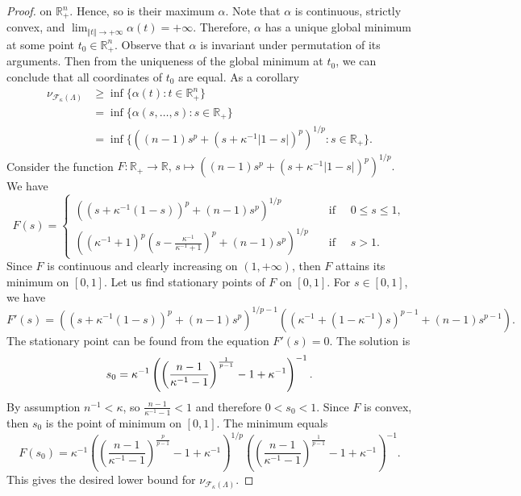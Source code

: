 \documentclass[12pt]{article}
\begin{document}
\begin{proof}
    on $\mathbb{R}_+^n$. Hence, so is their maximum $\alpha$. Note 
    that $\alpha$ is continuous, strictly convex, 
    and $\lim_{\Vert t\Vert\to+\infty}\alpha(t)=+\infty$. Therefore, $\alpha$ 
    has a unique global minimum at some point $t_0\in\mathbb{R}_+^n$. Observe 
    that $\alpha$ is invariant under permutation of its arguments. Then from 
    the uniqueness of the global minimum at $t_0$, we can conclude that all 
    coordinates of $t_0$ are equal. As a corollary
    \[
    \begin{aligned}
        \nu_{\mathcal{F}_{\kappa}(\Lambda)}
        &\geq\inf\{\alpha(t) : t\in\mathbb{R}_+^n\} \\
        &=\inf\{\alpha(s,\ldots,s) : s\in\mathbb{R}_+\} \\
        &=\inf\{((n-1)s^p+(s+\kappa^{-1}|1-s|)^p)^{1/p} : s\in\mathbb{R}_+\}.
    \end{aligned}
    \]
    Consider the function
    $
        F:\mathbb{R}_+\to\mathbb{R},\,
        s\mapsto ((n-1)s^p+(s+\kappa^{-1}|1-s|)^p)^{1/p}.
    $
    We have 
    \[
        F(s)=
        \begin{cases}
            ((s+\kappa^{-1}(1-s))^p+(n-1)s^p)^{1/p}
            \quad&\text{if }\quad 0\leq s\leq 1, \\
            \left(
                (\kappa^{-1}+1)^p
                \left(s-\frac{\kappa^{-1}}{\kappa^{-1}+1}\right)^p+
                (n-1)s^p
            \right)^{1/p}
            \quad&\text{if }\quad s>1.
        \end{cases}
    \]
    Since $F$ is continuous and clearly increasing on $(1,+\infty)$, then $F$ 
    attains its minimum on $[0, 1]$. Let us find stationary points 
    of $F$ on $[0, 1]$. For $s\in[0,1]$, we have
    \[
        F'(s)=
        ((s+\kappa^{-1}(1-s))^p+(n-1)s^p)^{1/p-1}
        ((\kappa^{-1}+(1-\kappa^{-1})s)^{p-1}+(n-1)s^{p-1}).
    \]
    The stationary point can be found from the equation $F'(s)=0$. 
    The solution is
    \[
        s_0
        =
        \kappa^{-1}
        \left(
            \left(
                \frac{n-1}{\kappa^{-1}-1}
            \right)^{\frac{1}{p-1}}
            -1+\kappa^{-1}
        \right)^{-1}.\\
    \]
    By assumption $n^{-1}<\kappa$, so $\frac{n-1}{\kappa^{-1}-1}<1$ and 
    therefore $0<s_0<1$. Since $F$ is convex, then $s_0$ is the point of 
    minimum on $[0,1]$. The minimum equals
    \[
        F(s_0)
        =\kappa^{-1}
        \left(
            \left(\frac{n-1}{\kappa^{-1}-1}
            \right)^{\frac{p}{p-1}}
            -1+\kappa^{-1}
        \right)^{1/p}
        \left(
            \left(\frac{n-1}{\kappa^{-1}-1}
            \right)^{\frac{1}{p-1}}
            -1+\kappa^{-1}
        \right)^{-1}.
    \]
    This gives the desired lower bound 
    for $\nu_{\mathcal{F}_{\kappa}(\Lambda)}$.
\end{proof}
\end{document}
